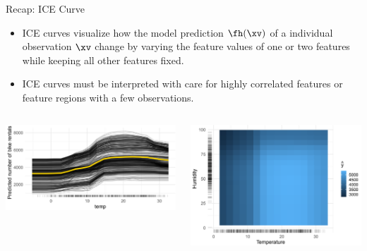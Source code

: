 \documentclass[11pt,compress,t,notes=noshow, aspectratio=169, xcolor=table]{beamer}
\begin{document}
\begin{vbframe}{Recap: ICE Curve}
		\begin{itemize}
		\item ICE curves visualize how the model prediction $\fh(\xv)$ of a individual observation $\xv$ change by varying the feature values of one or two features while keeping all other features fixed. 
		\item ICE curves must be interpreted with care for highly correlated features or feature regions with a few observations. 
	\end{itemize}
\vspace{0.5cm}
\begin{columns}
	\begin{column}{0.47\textwidth}
		\includegraphics[width=1\textwidth]{figure/bike-sharing-dataset01.png}
	\end{column}
	\begin{column}{0.47\textwidth}
		\includegraphics[width=1\textwidth]{figure/bike-sharing-dataset02.png}
	\end{column}
\end{columns}
\end{vbframe}
\end{document}
